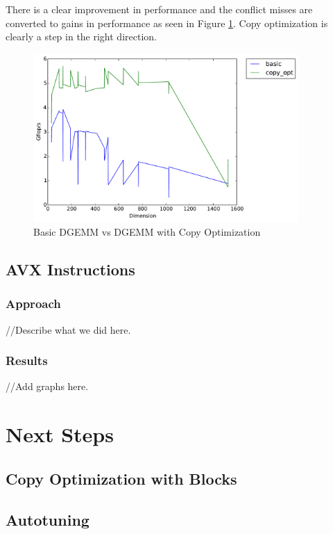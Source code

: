 \documentclass[11pt]{article}
\theoremstyle{plain}
\theoremstyle{definition}
\begin{document}
There is a clear improvement in performance and the conflict misses are converted to gains in performance as seen in Figure \ref{basic_copy_opt}. Copy optimization is clearly a step in the right direction. 


\begin{figure}[H]
    \includegraphics[width=0.9\textwidth]{timing_basic_vs_copy_opt.pdf}
    \caption{Basic DGEMM vs DGEMM with Copy Optimization}
    \label{basic_copy_opt}
\end{figure} 

\subsection{AVX Instructions}
\subsubsection{Approach}
//Describe what we did here.
\subsubsection{Results}
//Add graphs here.



\section{Next Steps}
\subsection{Copy Optimization with Blocks}
\subsection{Autotuning}





 
 
\end{document}
